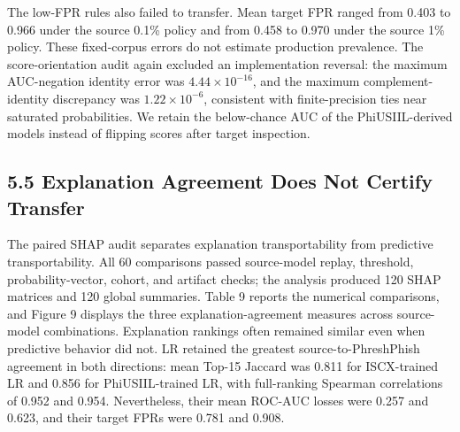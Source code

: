 \documentclass[
  10pt,
]{article}
\begin{document}
The low-FPR rules also failed to transfer. Mean target FPR ranged from
0.403 to 0.966 under the source 0.1\% policy and from 0.458 to 0.970
under the source 1\% policy. These fixed-corpus errors do not estimate
production prevalence. The score-orientation audit again excluded an
implementation reversal: the maximum AUC-negation identity error was
\(4.44\times10^{-16}\), and the maximum complement-identity discrepancy
was \(1.22\times10^{-6}\), consistent with finite-precision ties near
saturated probabilities. We retain the below-chance AUC of the
PhiUSIIL-derived models instead of flipping scores after target
inspection.

\subsection{5.5 Explanation Agreement Does Not Certify
Transfer}\label{explanation-agreement-does-not-certify-transfer}

The paired SHAP audit separates explanation transportability from
predictive transportability. All 60 comparisons passed source-model
replay, threshold, probability-vector, cohort, and artifact checks; the
analysis produced 120 SHAP matrices and 120 global summaries. Table 9
reports the numerical comparisons, and Figure 9 displays the three
explanation-agreement measures across source-model combinations.
Explanation rankings often remained similar even when predictive
behavior did not. LR retained the greatest source-to-PhreshPhish
agreement in both directions: mean Top-15 Jaccard was 0.811 for
ISCX-trained LR and 0.856 for PhiUSIIL-trained LR, with full-ranking
Spearman correlations of 0.952 and 0.954. Nevertheless, their mean
ROC-AUC losses were 0.257 and 0.623, and their target FPRs were 0.781
and 0.908.
\end{document}
